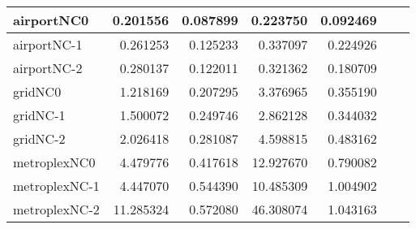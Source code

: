 \begin{longtable}{|l|r|r|r|r|r|r|}
airportNC0 & 0.201556 & 0.087899 & 0.223750 & 0.092469 \\ \hline
airportNC-1 & 0.261253 & 0.125233 & 0.337097 & 0.224926 \\ \hline
airportNC-2 & 0.280137 & 0.122011 & 0.321362 & 0.180709 \\ \hline
gridNC0 & 1.218169 & 0.207295 & 3.376965 & 0.355190 \\ \hline
gridNC-1 & 1.500072 & 0.249746 & 2.862128 & 0.344032 \\ \hline
gridNC-2 & 2.026418 & 0.281087 & 4.598815 & 0.483162 \\ \hline
metroplexNC0 & 4.479776 & 0.417618 & 12.927670 & 0.790082 \\ \hline
metroplexNC-1 & 4.447070 & 0.544390 & 10.485309 & 1.004902 \\ \hline
metroplexNC-2 & 11.285324 & 0.572080 & 46.308074 & 1.043163 \\ \hline
\end{longtable}
